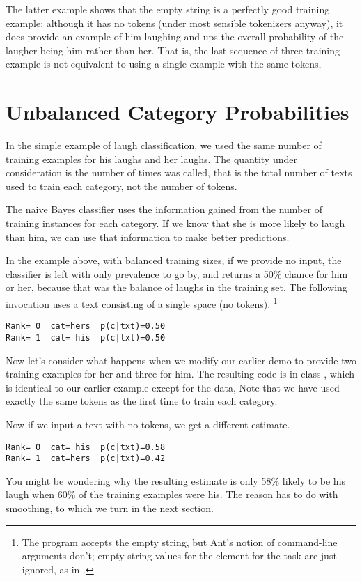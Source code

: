 The latter example shows that the empty string is a perfectly good
training example; although it has no tokens (under most sensible
tokenizers anyway), it does provide an example of him laughing and ups
the overall probability of the laugher being him rather than her.
That is, the last sequence of three training example is not equivalent to
using a single example with the same tokens,
%



\section{Unbalanced Category Probabilities}

In the simple example of laugh classification, we used the same number
of training examples for his laughs and her laughs.  The quantity
under consideration is the number of times  was
called, that is the total number of texts used to train each category,
not the number of tokens.

The naive Bayes classifier uses the information gained from the number
of training instances for each category.  If we know that she is more
likely to laugh than him, we can use that information to make better
predictions.  

In the example above, with balanced training sizes, if we provide no
input, the classifier is left with only prevalence to go by, and
returns a 50\% chance for him or her, because that was the balance of
laughs in the training set.  The following invocation uses a text
consisting of a single space (no tokens).%
%
\footnote{The program accepts the empty string, but Ant's notion of
  command-line arguments don't; empty string values for the 
  element for the  task are just ignored, as in
  .}
%
\begin{verbatim}
Rank= 0  cat=hers  p(c|txt)=0.50
Rank= 1  cat= his  p(c|txt)=0.50
\end{verbatim}
%

Now let's consider what happens when we modify our earlier demo
to provide two training examples for her and three for him.  The
resulting code is in class , which is identical
to our earlier example except for the data,
%
%
%
Note that we have used exactly the same tokens as the first
time to train each category.  


Now if we input a text with no tokens, we get a different estimate.
%
\begin{verbatim}
Rank= 0  cat= his  p(c|txt)=0.58
Rank= 1  cat=hers  p(c|txt)=0.42
\end{verbatim}
%
You might be wondering why the resulting estimate is only 58\% likely
to be his laugh when 60\% of the training examples were his.  The
reason has to do with smoothing, to which we turn in the next section.


